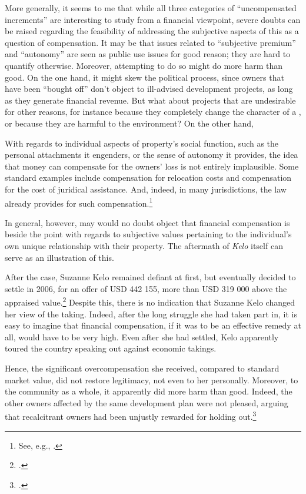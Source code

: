 {{More generally, it seems to me that while all three categories of ``uncompensated increments'' are interesting to study from a financial viewpoint, severe doubts can be raised regarding the feasibility of addressing the subjective aspects of this as a question of compensation. It may be that issues related to ``subjective premium'' and ``autonomy'' are seen as public use issues for good reason; they are hard to quantify otherwise. Moreover, attempting to do so might do more harm than good. On the one hand, it might skew the political process, since owners that have been ``bought off'' don't object to ill-advised development projects, as long as they generate financial revenue. But what about projects that are undesirable for other reasons, for instance because they completely change the character of a , or because they are harmful to the environment? On the other hand, }

With regards to individual aspects of property's social function, such as the personal attachments it engenders, or the sense of autonomy it provides, the idea that money can compensate for the owners' loss is not entirely implausible. Some standard examples include compensation for relocation costs and compensation for the cost of juridical assistance. And, indeed, in many jurisdictions, the law already provides for such compensation.\footnote{See, e.g., \cite[121-126]{garnett06}.}

In general, however, may would no doubt object that financial compensation is beside the point with regards to subjective values pertaining to the individual's own unique relationship with their property. The aftermath of {\it Kelo} itself can serve as an illustration of this.

After the case, Suzanne Kelo remained defiant at first, but eventually decided to settle in 2006, for an offer of USD 442 155, more than USD 319 000 above the appraised value.\footcite[1709]{lehavi07} Despite this, there is no indication that Suzanne Kelo changed her view of the taking. Indeed, after the long struggle she had taken part in, it is easy to imagine that financial compensation, if it was to be an effective remedy at all, would have to be very high. Even after she had settled, Kelo apparently toured the country speaking out against economic takings.

Hence, the significant overcompensation she received, compared to standard market value, did not restore legitimacy, not even to her personally. Moreover, to the community as a whole, it apparently did more harm than good. Indeed, the other owners affected by the same development plan were not pleased, arguing that recalcitrant owners had been unjustly rewarded for holding out.\footcite[1709]{lehavi07} 

}
